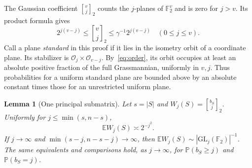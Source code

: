 \documentclass[11pt,letterpaper]{article}
\newtheorem{lemma}[theorem]{Lemma}
\newcommand{\F}{\mathbb F_2}\newcommand{\E}{\mathbb E}\newcommand{\PP}{\mathbb P}
\newcommand{\GL}{\mathrm{GL}}\newcommand{\nul}{\operatorname{null}}
\newcommand{\ga}[2]{\genfrac{[}{]}{0pt}{}{#1}{#2}_{\!2}}
\newcommand{\rgp}{\mathcal O}
\begin{document}
The Gaussian coefficient $\ga{v}{j}$ counts the $j$-planes of $\F^v$ and is zero for $j>v$. Its product formula gives
\[
 2^{j(v-j)}\le\ga vj\le\gamma^{-1}2^{j(v-j)}\quad(0\le j\le v).
\]
Call a plane \emph{standard} in this proof if it lies in the isometry orbit of a coordinate plane. Its stabilizer is $\rgp_j\times\rgp_{v-j}$. By~\eqref{eq:order}, its orbit occupies at least an absolute positive fraction of the full Grassmannian, uniformly in $v,j$. Thus probabilities for a uniform standard plane are bounded above by an absolute constant times those for an unrestricted uniform plane.

\begin{lemma}[One principal submatrix]\label{lem:one}
Let $s=|S|$ and $W_j(S)=\ga{b_S}{j}$. Uniformly for $j\le\min(s,n-s)$,
\[
 \E W_j(S)\asymp 2^{-j^2}.
\]
If $j\to\infty$ and $\min(s-j,n-s-j)\to\infty$, then
$\E W_j(S)\sim |\GL_j(\F)|^{-1}$. The same equivalents and comparisons hold, as $j\to\infty$, for $\PP(b_S\ge j)$ and $\PP(b_S=j)$.
\end{lemma}
\end{document}
